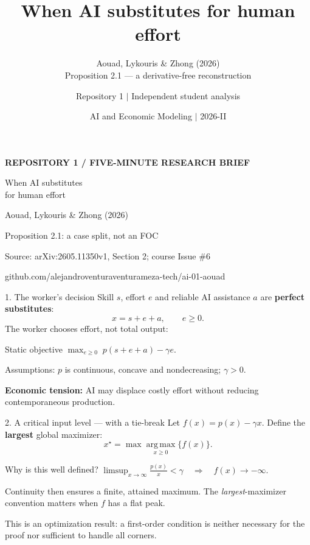 \documentclass[aspectratio=169,11pt]{beamer}
\title{When AI substitutes for human effort}
\subtitle{Aouad, Lykouris \& Zhong (2026) \\ Proposition 2.1 --- a derivative-free reconstruction}
\author{Repository 1 $\mid$ Independent student analysis}
\date{AI and Economic Modeling $\mid$ 2026-II}
\newcommand{\highlight}[1]{{\color{accent}\bfseries #1}}
\begin{document}
\begin{frame}[plain]
  \vspace{0.8cm}
  {\color{accent}\bfseries REPOSITORY 1 \quad / \quad FIVE-MINUTE RESEARCH BRIEF}\par
  \vspace{1.0cm}
  {\color{ink}\huge When AI substitutes\\[0.12cm] for human effort}\par
  \vspace{0.42cm}
  {\large Aouad, Lykouris \& Zhong (2026)}\par
  \vspace{0.22cm}
  {\large Proposition 2.1: a case split, not an FOC}\par
  \vfill
  {\small Source: arXiv:2605.11350v1, Section 2; course Issue \#6}\par
  {\scriptsize github.com/alejandroventuraventurameza-tech/ai-01-aouad}\par
  \vspace{0.5cm}
\end{frame}

\begin{frame}{1. The worker's decision}
  \large
  Skill $s$, effort $e$ and reliable AI assistance $a$ are \highlight{perfect substitutes}:
  \[
    x=s+e+a,\qquad e\geq 0.
  \]
  The worker chooses effort, not total output:
  \begin{block}{Static objective}
    \centering\Large $\displaystyle \max_{e\geq0}\; p(s+e+a)-\gamma e.$
  \end{block}
  \normalsize
  \vspace{0.25cm}
  Assumptions: $p$ is continuous, concave and nondecreasing; $\gamma>0$.
  \vspace{0.3cm}
  \par\highlight{Economic tension:} AI may displace costly effort without reducing contemporaneous production.
\end{frame}

\begin{frame}{2. A critical input level --- with a tie-break}
  \large
  Let $f(x)=p(x)-\gamma x$. Define the \highlight{largest} global maximizer:
  \[
    x^\star=\max\operatorname*{arg\,max}_{x\geq0}\{f(x)\}.
  \]
  \begin{block}{Why is this well defined?}
    \centering
    $\displaystyle \limsup_{x\to\infty}\frac{p(x)}{x}<\gamma
    \quad\Longrightarrow\quad f(x)\to-\infty.$
  \end{block}
  \vspace{0.18cm}
  Continuity then ensures a finite, attained maximum. The \emph{largest}-maximizer convention matters when $f$ has a flat peak.
  \vspace{0.28cm}
  \par\small This is an optimization result: a first-order condition is neither necessary for the proof nor sufficient to handle all corners.
\end{frame}
\end{document}

